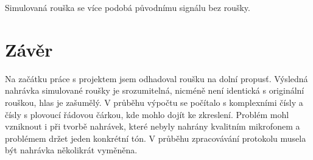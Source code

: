 \documentclass[12pt,czech]{article}
\begin{document}
Simulovaná rouška se více podobá původnímu signálu bez roušky.

\section{Závěr}
Na začátku práce s projektem jsem odhadoval roušku na dolní propusť. Výsledná nahrávka simulované roušky je srozumitelná, nicméně není identická s originální rouškou, hlas je zašumělý. V průběhu výpočtu se počítalo s komplexními čísly a čísly s plovoucí řádovou čárkou, kde mohlo dojít ke zkreslení. Problém mohl vzniknout i při tvorbě nahrávek, které nebyly nahrány kvalitním mikrofonem a problémem držet jeden konkrétní tón. V průběhu zpracovávání protokolu musela být nahrávka několikrát vyměněna.
\end{document}
